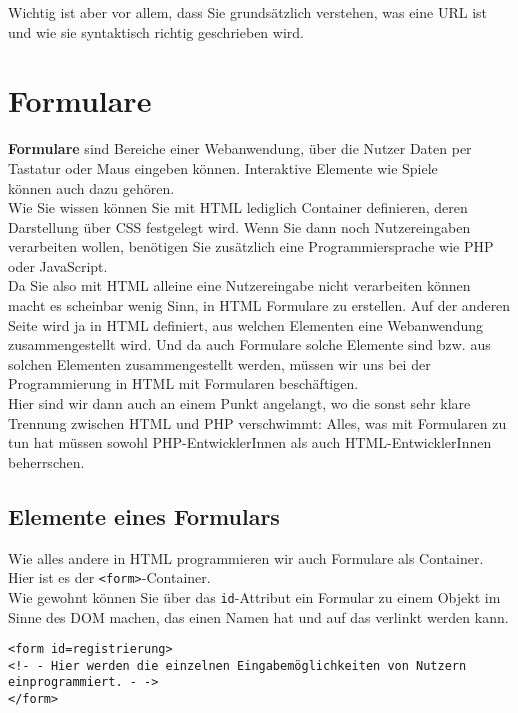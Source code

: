 Wichtig ist aber vor allem, dass Sie grundsätzlich verstehen, was eine URL ist und wie sie syntaktisch richtig geschrieben wird.

\section{Formulare}

\textbf{Formulare} sind Bereiche einer Webanwendung, über die Nutzer Daten per Tastatur oder Maus eingeben können. Interaktive Elemente wie Spiele \\können auch dazu gehören.\\

Wie Sie wissen können Sie mit HTML lediglich Container definieren, deren Darstellung über CSS festgelegt wird. Wenn Sie dann noch Nutzereingaben verarbeiten wollen, benötigen Sie zusätzlich eine Programmiersprache wie PHP oder JavaScript.\\

Da Sie also mit HTML alleine eine Nutzereingabe nicht verarbeiten können macht es scheinbar wenig Sinn, in HTML Formulare zu erstellen. Auf der anderen Seite wird ja in HTML definiert, aus welchen Elementen eine Webanwendung zusammengestellt wird. Und da auch Formulare solche Elemente sind bzw. aus solchen Elementen zusammengestellt werden, müssen wir uns bei der Programmierung in HTML mit Formularen beschäftigen.\\

Hier sind wir dann auch an einem Punkt angelangt, wo die sonst sehr klare Trennung zwischen HTML und PHP verschwimmt: Alles, was mit Formularen zu tun hat müssen sowohl PHP-EntwicklerInnen als auch HTML-EntwicklerInnen beherrschen.

\subsection{Elemente eines Formulars}

Wie alles andere in HTML programmieren wir auch Formulare  als Container. Hier ist es der \verb|<form>|-Container.\\

Wie gewohnt können Sie über das \verb|id|-Attribut ein Formular zu einem Objekt im Sinne des DOM machen, das einen Namen hat und auf das verlinkt werden kann.

\begin{verbatim}
<form id=registrierung>
<!- - Hier werden die einzelnen Eingabemöglichkeiten von Nutzern einprogrammiert. - ->
</form>
\end{verbatim}

